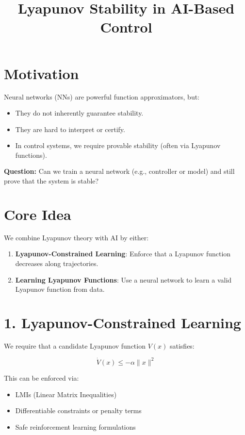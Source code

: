 \documentclass{article}
\title{Lyapunov Stability in AI-Based Control}
\date{}
\begin{document}
\maketitle

\section*{Motivation}

Neural networks (NNs) are powerful function approximators, but:

\begin{itemize}
  \item They do not inherently guarantee stability.
  \item They are hard to interpret or certify.
  \item In control systems, we require provable stability (often via Lyapunov functions).
\end{itemize}

\textbf{Question:} Can we train a neural network (e.g., controller or model) and still prove that the system is stable?

\section*{Core Idea}

We combine Lyapunov theory with AI by either:

\begin{enumerate}
  \item \textbf{Lyapunov-Constrained Learning}: Enforce that a Lyapunov function decreases along trajectories.
  \item \textbf{Learning Lyapunov Functions}: Use a neural network to learn a valid Lyapunov function from data.
\end{enumerate}

\section*{1. Lyapunov-Constrained Learning}

We require that a candidate Lyapunov function \( V(x) \) satisfies:

\[
\dot{V}(x) \leq -\alpha \|x\|^2
\]

This can be enforced via:

\begin{itemize}
  \item LMIs (Linear Matrix Inequalities)
  \item Differentiable constraints or penalty terms
  \item Safe reinforcement learning formulations
\end{itemize}
\end{document}
